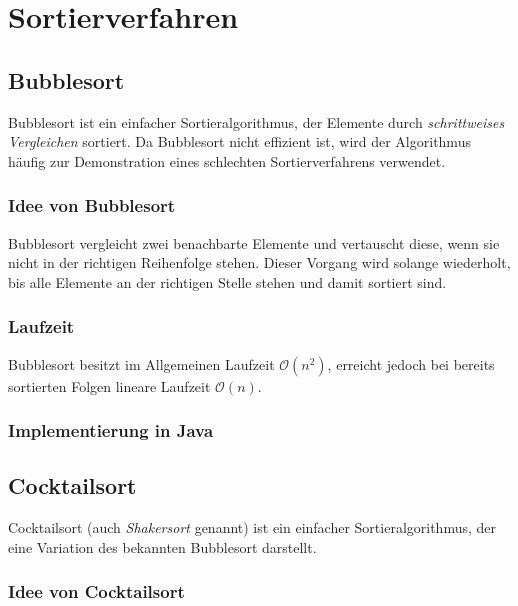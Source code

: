 \documentclass[german]{pfBook}
\newcommand{\OO}{\mathcal{O}}
\begin{document}
	\section{Sortierverfahren}
	
	\subsection{Bubblesort}
	
	Bubblesort ist ein einfacher Sortieralgorithmus, der Elemente durch \emph{schrittweises Vergleichen} sortiert. Da Bubblesort nicht effizient ist, wird der Algorithmus häufig zur Demonstration eines schlechten Sortierverfahrens verwendet.
	
	\subsubsection{Idee von Bubblesort}
	
	Bubblesort vergleicht zwei benachbarte Elemente und vertauscht diese, wenn sie nicht in der richtigen Reihenfolge stehen. Dieser Vorgang wird solange wiederholt, bis alle Elemente an der richtigen Stelle stehen und damit sortiert sind.
	
	\subsubsection{Laufzeit}
	
	Bubblesort besitzt im Allgemeinen Laufzeit $\OO(n^2)$, erreicht jedoch bei bereits sortierten Folgen lineare Laufzeit $\OO(n)$.
	
	\subsubsection{Implementierung in Java}
	
	
	
	\subsection{Cocktailsort}
	
	Cocktailsort (auch \emph{Shakersort} genannt) ist ein einfacher Sortieralgorithmus, der eine Variation des bekannten Bubblesort darstellt.
	
	\subsubsection{Idee von Cocktailsort}
	
\end{document}
